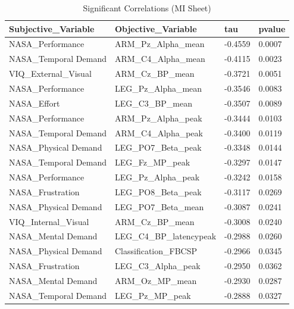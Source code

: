 \documentclass[10pt,letterpaper]{article}
\begin{document}
\begin{longtable}{@{}llll@{}}

\caption{Significant Correlations (MI Sheet)}
\label{tab:mi_correlations} \\

\toprule
\rowcolor[HTML]{EFEFEF} 
Subjective\_Variable & Objective\_Variable & tau & pvalue \\ \midrule

NASA\_Performance & ARM\_Pz\_Alpha\_mean & -0.4559 & 0.0007 \\
\rowcolor[HTML]{EFEFEF} 
NASA\_Temporal Demand & ARM\_C4\_Alpha\_mean & -0.4115 & 0.0023 \\
VIQ\_External\_Visual & ARM\_Cz\_BP\_mean & -0.3721 & 0.0051 \\
\rowcolor[HTML]{EFEFEF} 
NASA\_Performance & LEG\_Pz\_Alpha\_mean & -0.3546 & 0.0083 \\
NASA\_Effort & LEG\_C3\_BP\_mean & -0.3507 & 0.0089 \\
\rowcolor[HTML]{EFEFEF} 
NASA\_Performance & ARM\_Pz\_Alpha\_peak & -0.3444 & 0.0103 \\
NASA\_Temporal Demand & ARM\_C4\_Alpha\_peak & -0.3400 & 0.0119 \\
\rowcolor[HTML]{EFEFEF} 
NASA\_Physical Demand & LEG\_PO7\_Beta\_peak & -0.3348 & 0.0144 \\
NASA\_Temporal Demand & LEG\_Fz\_MP\_peak & -0.3297 & 0.0147 \\
\rowcolor[HTML]{EFEFEF} 
NASA\_Performance & LEG\_Pz\_Alpha\_peak & -0.3242 & 0.0158 \\
NASA\_Frustration & LEG\_PO8\_Beta\_peak & -0.3117 & 0.0269 \\
\rowcolor[HTML]{EFEFEF} 
NASA\_Physical Demand & LEG\_PO7\_Beta\_mean & -0.3087 & 0.0241 \\
VIQ\_Internal\_Visual & ARM\_Cz\_BP\_mean & -0.3008 & 0.0240 \\
\rowcolor[HTML]{EFEFEF} 
NASA\_Mental Demand & LEG\_C4\_BP\_latencypeak & -0.2988 & 0.0260 \\
NASA\_Physical Demand & Classification\_FBCSP & -0.2966 & 0.0345 \\
\rowcolor[HTML]{EFEFEF} 
NASA\_Frustration & LEG\_C3\_Alpha\_peak & -0.2950 & 0.0362 \\
NASA\_Mental Demand & ARM\_Oz\_MP\_mean & -0.2930 & 0.0287 \\
\rowcolor[HTML]{EFEFEF} 
NASA\_Temporal Demand & LEG\_Pz\_MP\_peak & -0.2888 & 0.0327 \\

\end{longtable}
\end{document}
